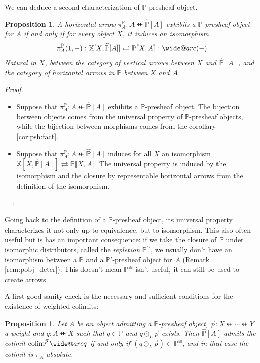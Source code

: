 \documentclass[10pt,a4paper]{article}
\makeatletter
\newcommand{\bb}[1]{\mathbb{#1}}
\newcommand{\PP}{{\bb P}}
\newcommand{\dfrom}{\nvleftarrow}
\newcommand{\iset}[1]{\llbracket #1 \rrbracket}
\newcommand{\psh}[2]{{\widehat{#1}}[{#2}]}
\newcommand{\simeqq}{\cong}
\DeclareMathOperator{\colim}{colim}
\def\widearc{\mathpalette\wide@arc}
\def\wide@arc#1#2{\sbox\z@{$#1#2$}%
     \mathop{\vbox{\m@th\ialign{##\crcr
\kern0.08em\arcfill#1{0.8\wd\z@}\crcr\noalign{\nointerlineskip}%
                    $\hss#1#2\hss$\crcr}}}\limits}
\def\arcfill#1#2{$\m@th\sbox\tw@{$#1($}%
  \hss\resizebox{#2}{\wd\tw@}{\rotatebox[origin=c]{-90}{\upshape(}}\hss$}
\theoremstyle{plain}
\newtheorem{proposition}[theorem]{Proposition}
\theoremstyle{definition}
\theoremstyle{remark}
\makeatother
\begin{document}
We can deduce a second characterization of $\PP$-presheaf object.

\begin{proposition}
    A horizontal arrow $\pi_A^\PP : A \dfrom \psh\PP A$ exhibits a $\PP$-presheaf object for $A$ if and only if for every object $X$, it induces an isomorphism
    $$\pi_A^\PP(1, -) : \bb{X}[X, \psh\PP A] \rightleftarrows \PP\iset{X, A} : \widearc{(-)}$$
    Natural in $X$, between the category of vertical arrows between $X$ and $\psh\PP A$, and the category of horizontal arrows in $\PP$ between $X$ and $A$.
\end{proposition}

\begin{proof}\hfill
    \begin{itemize}
        \item Suppose that $\pi_A^\PP : A \dfrom \psh\PP A$ exhibits a $\PP$-presheaf object. The bijection between objects comes from the universal property of $\PP$-presheaf objects, while the bijection between morphisms comes from the corollary \ref{cor:psh:fact}.
        \item Suppose that $\pi_A^\PP : A \dfrom \psh\PP A$ induces for all $X$ an isomorphism $\bb{X}[X, \psh\PP A] \rightleftarrows \PP\iset{X, A}$. The universal property is induced by the isomorphism and the closure by representable horizontal arrows from the definition of the isomorphism.
    \end{itemize}
\end{proof}

Going back to the definition of a $\PP$-presheaf object, its universal property characterizes it not only up to equivalence, but to isomorphism. This also often useful but is has an important consequence: if we take the closure of $\PP$ under isomorphic distributors, called the \textit{repletion} $\PP^\simeqq$, we usually don't have an isomorphism between a $\PP$ and a $\PP'$-presheaf object for $A$ (Remark \ref{rem:pobj_deter}). This doesn't mean $\PP^\simeqq$ isn't useful, it can still be used to create arrows. 

A first good sanity check is the necessary and sufficient conditions for the existence of weighted colimits:

\begin{proposition}
    \label{prop:psh_colims}
    Let $A$ be an object admitting a $\PP$-presheaf object, $\vec{p} : X \dfrom \cdots \dfrom Y$ a weight and $q : A \dfrom X$ such that $q\in\PP$ and $q\odot_L \vec{p}$ exists. Then $\psh\PP A$ admits the colimit $\colim^{\vec{p}}\widearc{q}$ if and only if $(q\odot_L\vec{p})\in\PP^\simeqq$, and in that case the colimit is $\pi_A$-absolute.
\end{proposition}
\end{document}

